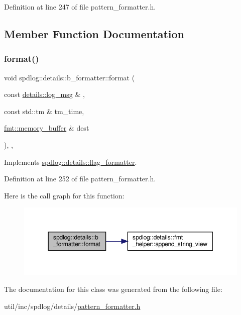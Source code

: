 Definition at line 247 of file pattern\+\_\+formatter.\+h.



\subsection{Member Function Documentation}
\mbox{\label{classspdlog_1_1details_1_1b__formatter_a3943edd9e27eb217e4871abf06b91df5}} 
\subsubsection{\texorpdfstring{format()}{format()}}
{\footnotesize\ttfamily void spdlog\+::details\+::b\+\_\+formatter\+::format (\begin{DoxyParamCaption}\item[{const \hyperlink{structspdlog_1_1details_1_1log__msg}{details\+::log\+\_\+msg} \&}]{,  }\item[{const std\+::tm \&}]{tm\+\_\+time,  }\item[{\hyperlink{format_8h_a21cbf729f69302f578e6db21c5e9e0d2}{fmt\+::memory\+\_\+buffer} \&}]{dest }\end{DoxyParamCaption})\hspace{0.3cm}{\ttfamily [inline]}, {\ttfamily [override]}, {\ttfamily [virtual]}}



Implements \hyperlink{classspdlog_1_1details_1_1flag__formatter_a33fb3e42a4c8200cceb833d92b53fb67}{spdlog\+::details\+::flag\+\_\+formatter}.



Definition at line 252 of file pattern\+\_\+formatter.\+h.

Here is the call graph for this function\+:
\nopagebreak
\begin{figure}[H]
\begin{center}
\leavevmode
\includegraphics[width=350pt]{classspdlog_1_1details_1_1b__formatter_a3943edd9e27eb217e4871abf06b91df5_cgraph}
\end{center}
\end{figure}


The documentation for this class was generated from the following file\+:\begin{DoxyCompactItemize}
\item 
util/inc/spdlog/details/\hyperlink{pattern__formatter_8h}{pattern\+\_\+formatter.\+h}\end{DoxyCompactItemize}
